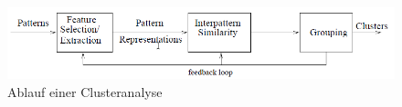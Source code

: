 \begin{figure}[H]
    \centering
    \includegraphics[width=0.8\linewidth]{../resources/img/grundlagen/clustering_workflow}
    \caption{Ablauf einer Clusteranalyse}
    \label{fig:grund_clustering_workflow}
\end{figure}